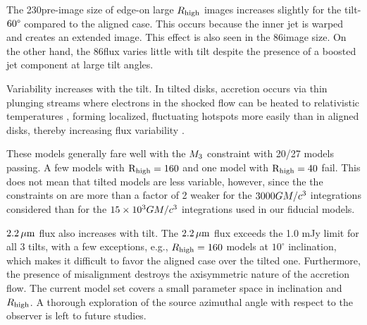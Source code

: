 The 230\GHz pre-image size of edge-on large $R_\mathrm{high}$ images increases slightly for the tilt-$60\degree$ compared to the aligned case. This occurs because the inner jet is warped and creates an extended image. This effect is also seen in the 86\GHz image size. On the other hand, the 86\GHz flux varies little with tilt despite the presence of a boosted jet component at large tilt angles.


Variability increases with the tilt. In tilted disks, accretion occurs via thin plunging streams \citep[e.g.,][]{Fragile2007} where electrons in the shocked flow can be heated to relativistic temperatures \citep[e.g.,][]{Dexter2013, 2014ApJ...780...81G, White2019}, forming localized, fluctuating hotspots more easily than in aligned disks, thereby increasing flux variability \citep{Chatterjee2020, 2021arXiv210412896W}.


These models generally fare well with the $M_{3}$ constraint with 20/27 models passing. A few models with $\rm R_{high}=160$ and one model with $\rm R_{high}=40$ fail.  This does not mean that tilted models are less variable, however, since the the constraints on  are more than a factor of 2 weaker for the $3000GM/c^3$ integrations considered than for the $15 \times 10^3GM/c^3$ integrations used in our fiducial models.

$2.2\,\mu\mathrm{m}$ flux also increases with tilt.  The $2.2\,\mu\mathrm{m}$ flux exceeds the 1.0 mJy limit for all 3 tilts, with a few exceptions, e.g., $R_{\rm high}=160$ models at $10^{\circ}$ inclination, which makes it difficult to favor the aligned case over the tilted one. Furthermore, the presence of misalignment destroys the axisymmetric nature of the accretion flow.  The current model set covers a small parameter space in inclination and $R_{\rm high}$.  A thorough exploration of the source azimuthal angle with respect to the observer is left to future studies.

